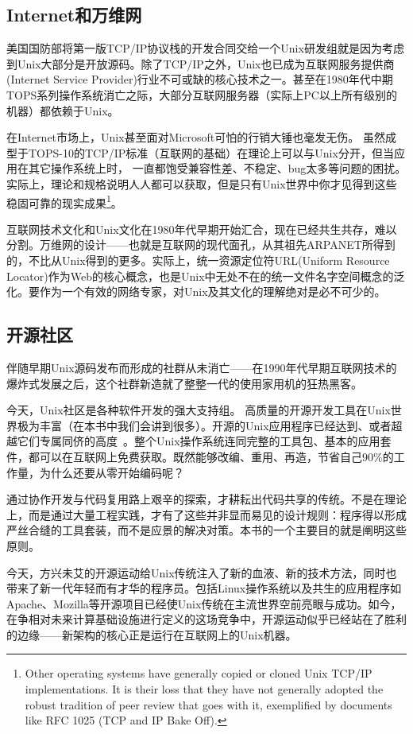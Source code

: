 \documentclass[12pt,oneside]{ctexbook}
\begin{document}
\begin{common-format}
\subsection{Internet和万维网}
美国国防部将第一版TCP/IP协议栈的开发合同交给一个Unix研发组就是因为考虑到Unix大部分是开放源码。除了TCP/IP之外，Unix也已成为互联网服务提供商(Internet Service Provider)行业不可或缺的核心技术之一。甚至在1980年代中期TOPS系列操作系统消亡之际，大部分互联网服务器（实际上PC以上所有级别的机器）都依赖于Unix。

在Internet市场上，Unix甚至面对Microsoft可怕的行销大锤也毫发无伤。  虽然成型于TOPS-10的TCP/IP标准（互联网的基础）在理论上可以与Unix分开，但当应用在其它操作系统上时，  一直都饱受兼容性差、不稳定、bug太多等问题的困扰。实际上，理论和规格说明人人都可以获取，但是只有Unix世界中你才见得到这些稳固可靠的现实成果\footnote{Other operating systems have generally copied or cloned Unix TCP/IP implementations. It is their loss that they have not generally adopted the robust tradition of peer review that goes with it, exemplified by documents like RFC 1025 (TCP and IP Bake Off).}。

互联网技术文化和Unix文化在1980年代早期开始汇合，现在已经共生共存，难以分割。万维网的设计——也就是互联网的现代面孔，从其祖先ARPANET所得到的，不比从Unix得到的更多。实际上，统一资源定位符URL(Uniform Resource Locator)作为Web的核心概念，也是Unix中无处不在的统一文件名字空间概念的泛化。要作为一个有效的网络专家，对Unix及其文化的理解绝对是必不可少的。

\subsection{开源社区}
伴随早期Unix源码发布而形成的社群从未消亡——在1990年代早期互联网技术的爆炸式发展之后，这个社群新造就了整整一代的使用家用机的狂热黑客。

今天，Unix社区是各种软件开发的强大支持组。  高质量的开源开发工具在Unix世界极为丰富（在本书中我们会讲到很多）。开源的Unix应用程序已经达到、或者超越它们专属同侪的高度~\cite{Fuzz}。整个Unix操作系统连同完整的工具包、基本的应用套件，都可以在互联网上免费获取。既然能够改编、重用、再造，节省自己90\%的工作量，为什么还要从零开始编码呢？

通过协作开发与代码复用路上艰辛的探索，才耕耘出代码共享的传统。不是在理论上，而是通过大量工程实践，才有了这些并非显而易见的设计规则：程序得以形成严丝合缝的工具套装，而不是应景的解决对策。本书的一个主要目的就是阐明这些原则。

今天，方兴未艾的开源运动给Unix传统注入了新的血液、新的技术方法，同时也带来了新一代年轻而有才华的程序员。包括Linux操作系统以及共生的应用程序如Apache、Mozilla等开源项目已经使Unix传统在主流世界空前亮眼与成功。如今，在争相对未来计算基础设施进行定义的这场竞争中，开源运动似乎已经站在了胜利的边缘——新架构的核心正是运行在互联网上的Unix机器。


\end{common-format}
\end{document}
